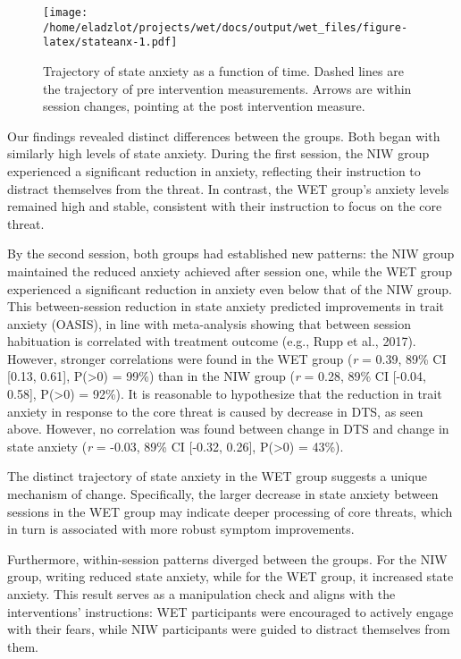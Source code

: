 \documentclass[
  man,floatsintext]{apa7}
\begin{document}
\begin{figure}
\centering
\texttt{[image: /home/eladzlot/projects/wet/docs/output/wet\_files/figure-latex/stateanx-1.pdf]}
\caption{\label{fig:stateanx}Trajectory of state anxiety as a function of time. Dashed lines are the trajectory of pre intervention measurements. Arrows are within session changes, pointing at the post intervention measure.}
\end{figure}

Our findings revealed distinct differences between the groups.
Both began with similarly high levels of state anxiety.
During the first session, the NIW group experienced a significant reduction in anxiety, reflecting their instruction to distract themselves from the threat.
In contrast, the WET group's anxiety levels remained high and stable, consistent with their instruction to focus on the core threat.

By the second session, both groups had established new patterns:
the NIW group maintained the reduced anxiety achieved after session one, while the WET group experienced a significant reduction in anxiety even below that of the NIW group.
This between-session reduction in state anxiety predicted improvements in trait anxiety (OASIS), in line with meta-analysis showing that between session habituation is correlated with treatment outcome (e.g., Rupp et al., 2017).
However, stronger correlations were found in the WET group (\emph{r} = 0.39, 89\% CI {[}0.13, 0.61{]}, P(\textgreater0) = 99\%) than in the NIW group (\emph{r} = 0.28, 89\% CI {[}-0.04, 0.58{]}, P(\textgreater0) = 92\%).
It is reasonable to hypothesize that the reduction in trait anxiety in response to the core threat is caused by decrease in DTS, as seen above.
However, no correlation was found between change in DTS and change in state anxiety (\emph{r} = -0.03, 89\% CI {[}-0.32, 0.26{]}, P(\textgreater0) = 43\%).

The distinct trajectory of state anxiety in the WET group suggests a unique mechanism of change.
Specifically, the larger decrease in state anxiety between sessions in the WET group may indicate deeper processing of core threats, which in turn is associated with more robust symptom improvements.

Furthermore, within-session patterns diverged between the groups.
For the NIW group, writing reduced state anxiety, while for the WET group, it increased state anxiety.
This result serves as a manipulation check and aligns with the interventions' instructions: WET participants were encouraged to actively engage with their fears, while NIW participants were guided to distract themselves from them.
\end{document}
